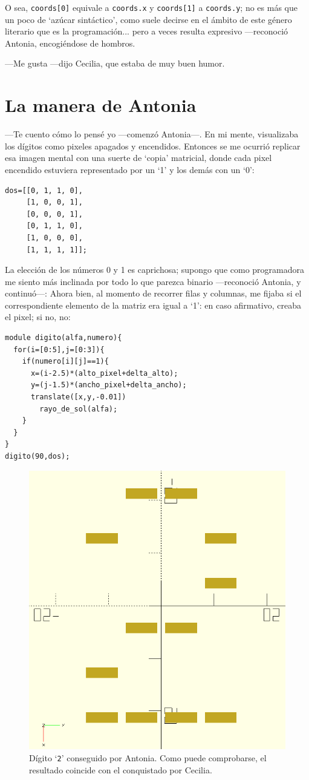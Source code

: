 \guillemotright O sea, \lstinline!coords[0]! equivale a
\lstinline!coords.x! y \lstinline!coords[1]! a \lstinline!coords.y!;
no es más que un poco de `azúcar sintáctico', como suele decirse en el
ámbito de este género literario que es la programación... pero a veces
resulta expresivo ---reconoció Antonia, encogiéndose de hombros.

---Me gusta ---dijo Cecilia, que estaba de muy buen humor.

\section{La manera de Antonia}


---Te cuento cómo lo pensé yo ---comenzó Antonia---.  En mi mente,
visualizaba los dígitos como pixeles apagados y encendidos. Entonces
se me ocurrió replicar esa imagen mental con una suerte de `copia'
matricial, donde cada pixel encendido estuviera representado por un
`1' y los demás con un `0':

\begin{lstlisting}
dos=[[0, 1, 1, 0],
     [1, 0, 0, 1],
     [0, 0, 0, 1],
     [0, 1, 1, 0],
     [1, 0, 0, 0],
     [1, 1, 1, 1]];
\end{lstlisting}

\guillemotright La elección de los números 0 y 1 es caprichosa;
supongo que como programadora me siento más inclinada por todo lo que
parezca binario ---reconoció Antonia, y continuó---: Ahora bien, al
momento de recorrer filas y columnas, me fijaba si el correspondiente
elemento de la matriz era igual a `1': en caso afirmativo, creaba el
pixel; si no, no:


\begin{lstlisting}
module digito(alfa,numero){
  for(i=[0:5],j=[0:3]){
    if(numero[i][j]==1){
      x=(i-2.5)*(alto_pixel+delta_alto);
      y=(j-1.5)*(ancho_pixel+delta_ancho);
      translate([x,y,-0.01])
        rayo_de_sol(alfa);
    }
  }
}
digito(90,dos);
\end{lstlisting}

\begin{figure}[ht]
  \centering
  \includegraphics[width=.39\textwidth]{imagenes/dos-cecilia}  
  \caption[Dígito \texttt{2} conseguido por Antonia.]{Dígito
    `\texttt{2}' conseguido por Antonia. Como puede comprobarse, el
    resultado coincide con el conquistado por Cecilia.}
  \label{fig:dos-antonia}
\end{figure}


